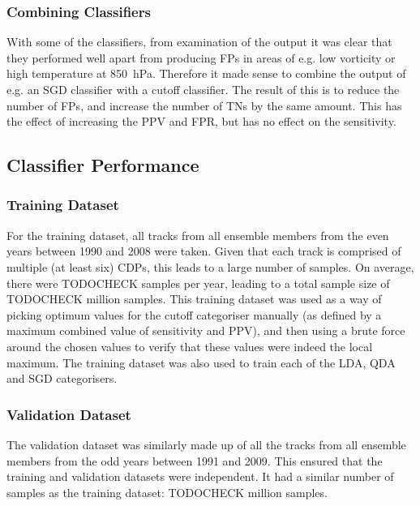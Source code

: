 \documentclass[pdftex,12pt,a4paper]{report}
\begin{document}
\subsubsection{Combining Classifiers}
With some of the classifiers, from examination of the output it was clear that they performed well
apart from producing FPs in areas of e.g. low vorticity or high temperature at \SI{850}{hPa}.
Therefore it made sense to combine the output of e.g. an SGD classifier with a cutoff classifier.
The result of this is to reduce the number of FPs, and increase the number of TNs by the same
amount. This has the effect of increasing the PPV and FPR, but has no effect on the sensitivity.

\subsection{Classifier Performance}



\subsubsection{Training Dataset}
For the training dataset, all tracks from all ensemble members from the even years between 1990 and
2008 were taken. Given that each track is comprised of multiple (at least six) CDPs, this leads to a
large number of samples. On average, there were TODOCHECK samples per year, leading to a total sample
size of TODOCHECK million samples. This training dataset was used as a way of picking optimum values for
the cutoff categoriser manually (as defined by a maximum combined value of sensitivity and PPV), and
then using a brute force around the chosen values to verify that these values were indeed the local
maximum. The training dataset was also used to train each of the LDA, QDA and SGD categorisers.

\subsubsection{Validation Dataset}
The validation dataset was similarly made up of all the tracks from all ensemble members from the
odd years between 1991 and 2009. This ensured that the training and validation datasets were
independent. It had a similar number of samples as the training dataset: TODOCHECK million samples.
\end{document}
